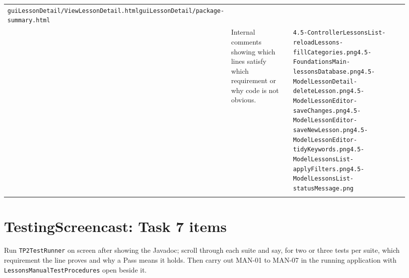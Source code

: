 \documentclass[10pt]{article}
\begin{document}
\begin{longtable}{@{}>{\raggedright\arraybackslash}p{0.07\linewidth} >{\raggedright\arraybackslash}p{0.33\linewidth} >{\raggedright\arraybackslash}p{0.54\linewidth}@{}}
\texttt{guiLessonDetail/ViewLessonDetail.html}\newline \texttt{guiLessonDetail/package-summary.html}} \\ \addlinespace[3pt]
4.5 & Internal comments showing which lines satisfy which requirement or why code is not obvious. & {\scriptsize \texttt{4.5-ControllerLessonsList-reloadLessons-fillCategories.png}\newline \texttt{4.5-FoundationsMain-lessonsDatabase.png}\newline \texttt{4.5-ModelLessonDetail-deleteLesson.png}\newline \texttt{4.5-ModelLessonEditor-saveChanges.png}\newline \texttt{4.5-ModelLessonEditor-saveNewLesson.png}\newline \texttt{4.5-ModelLessonEditor-tidyKeywords.png}\newline \texttt{4.5-ModelLessonsList-applyFilters.png}\newline \texttt{4.5-ModelLessonsList-statusMessage.png}} \\ \addlinespace[3pt]
\bottomrule\end{longtable}

\section*{TestingScreencast: Task 7 items}
Run \texttt{TP2TestRunner} on screen after showing the Javadoc; scroll through each suite and
say, for two or three tests per suite, which requirement the line proves and why a Pass means
it holds. Then carry out MAN-01 to MAN-07 in the running application with
\texttt{LessonsManualTestProcedures} open beside it.
\end{document}
